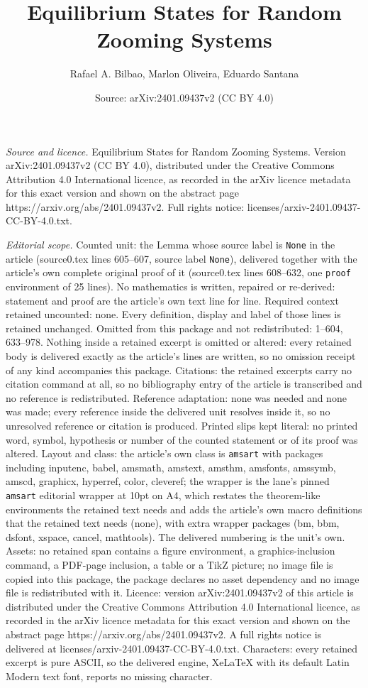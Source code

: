 \documentclass[10pt,a4paper]{amsart}
\title[Equilibrium States for Random Zooming Systems]{Equilibrium States for Random Zooming Systems}
\author{Rafael A. Bilbao, Marlon Oliveira, Eduardo Santana}
\date{Source: arXiv:2401.09437v2 (CC BY 4.0)}
\begin{document}
\maketitle

\noindent\emph{Source and licence.} Equilibrium States for Random Zooming Systems. Version arXiv:2401.09437v2 (CC BY 4.0), distributed under the Creative Commons Attribution 4.0 International licence, as recorded in the arXiv licence metadata for this exact version and shown on the abstract page https://arxiv.org/abs/2401.09437v2. Full rights notice: licenses/arxiv-2401.09437-CC-BY-4.0.txt.\par\smallskip

\noindent\textit{Editorial scope.} Counted unit: the Lemma whose source label is \texttt{None} in the article (source0.tex lines 605--607, source label \texttt{None}), delivered together with the article's own complete original proof of it (source0.tex lines 608--632, one \texttt{proof} environment of 25 lines). No mathematics is written, repaired or re-derived: statement and proof are the article's own text line for line. Required context retained uncounted: none. Every definition, display and label of those lines is retained unchanged. Omitted from this package and not redistributed: 1--604, 633--978. Nothing inside a retained excerpt is omitted or altered: every retained body is delivered exactly as the article's lines are written, so no omission receipt of any kind accompanies this package. Citations: the retained excerpts carry no citation command at all, so no bibliography entry of the article is transcribed and no reference is redistributed. Reference adaptation: none was needed and none was made; every reference inside the delivered unit resolves inside it, so no unresolved reference or citation is produced. Printed slips kept literal: no printed word, symbol, hypothesis or number of the counted statement or of its proof was altered. Layout and class: the article's own class is \texttt{amsart} with packages including inputenc, babel, amsmath, amstext, amsthm, amsfonts, amssymb, amscd, graphicx, hyperref, color, cleveref; the wrapper is the lane's pinned \texttt{amsart} editorial wrapper at 10pt on A4, which restates the theorem-like environments the retained text needs and adds the article's own macro definitions that the retained text needs (none), with extra wrapper packages (bm, bbm, dsfont, xspace, cancel, mathtools). The delivered numbering is the unit's own. Assets: no retained span contains a figure environment, a graphics-inclusion command, a PDF-page inclusion, a table or a TikZ picture; no image file is copied into this package, the package declares no asset dependency and no image file is redistributed with it. Licence: version arXiv:2401.09437v2 of this article is distributed under the Creative Commons Attribution 4.0 International licence, as recorded in the arXiv licence metadata for this exact version and shown on the abstract page https://arxiv.org/abs/2401.09437v2. A full rights notice is delivered at licenses/arxiv-2401.09437-CC-BY-4.0.txt. Characters: every retained excerpt is pure ASCII, so the delivered engine, XeLaTeX with its default Latin Modern text font, reports no missing character.
\end{document}
